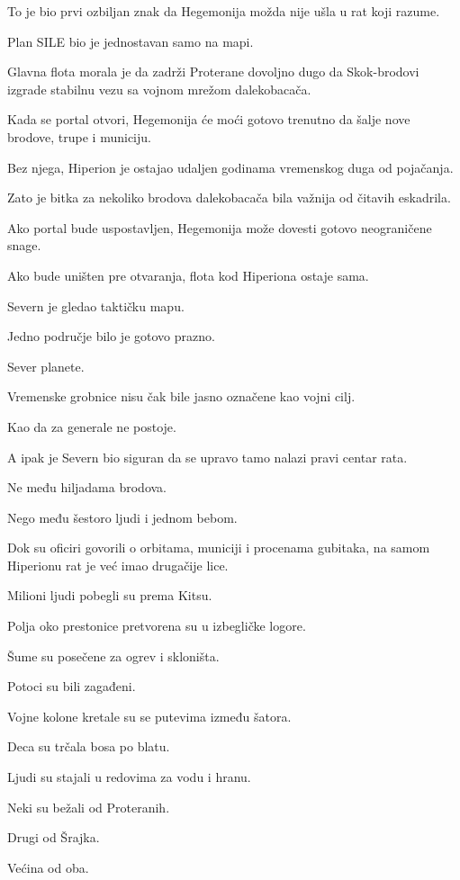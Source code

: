 To je bio prvi ozbiljan znak da Hegemonija možda nije ušla u rat koji razume.

\bigskip

Plan SILE bio je jednostavan samo na mapi.

Glavna flota morala je da zadrži Proterane dovoljno dugo da Skok-brodovi izgrade stabilnu vezu sa vojnom mrežom dalekobacača.

Kada se portal otvori, Hegemonija će moći gotovo trenutno da šalje nove brodove, trupe i municiju.

Bez njega, Hiperion je ostajao udaljen godinama vremenskog duga od pojačanja.

Zato je bitka za nekoliko brodova dalekobacača bila važnija od čitavih eskadrila.

Ako portal bude uspostavljen, Hegemonija može dovesti gotovo neograničene snage.

Ako bude uništen pre otvaranja, flota kod Hiperiona ostaje sama.

Severn je gledao taktičku mapu.

Jedno područje bilo je gotovo prazno.

Sever planete.

Vremenske grobnice nisu čak bile jasno označene kao vojni cilj.

Kao da za generale ne postoje.

A ipak je Severn bio siguran da se upravo tamo nalazi pravi centar rata.

Ne među hiljadama brodova.

Nego među šestoro ljudi i jednom bebom.

\bigskip

Dok su oficiri govorili o orbitama, municiji i procenama gubitaka, na samom Hiperionu rat je već imao drugačije lice.

Milioni ljudi pobegli su prema Kitsu.

Polja oko prestonice pretvorena su u izbegličke logore.

Šume su posečene za ogrev i skloništa.

Potoci su bili zagađeni.

Vojne kolone kretale su se putevima između šatora.

Deca su trčala bosa po blatu.

Ljudi su stajali u redovima za vodu i hranu.

Neki su bežali od Proteranih.

Drugi od Šrajka.

Većina od oba.

